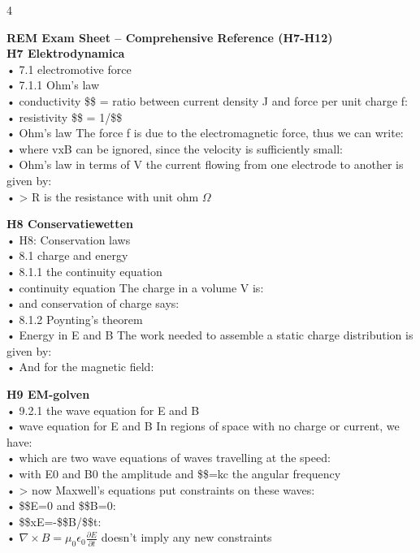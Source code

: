 \documentclass[8pt,a4paper]{article}
\begin{document}
\begin{multicols*}{4}

\textbf{\footnotesize REM Exam Sheet -- Comprehensive Reference (H7-H12)}\\[2pt]


\textbf{H7 Elektrodynamica}\\
• 7.1 electromotive force\\
• 7.1.1 Ohm's law\\
• conductivity \$\sigma\$  = ratio between current density J and force per unit charge f:\\
• resistivity \$\rho\$ = 1/\$\sigma\$\\
• Ohm's law The force f is due to the electromagnetic force, thus we can write:\\
• where vxB can be ignored, since the velocity is sufficiently small:\\
• Ohm's law in terms of V the current flowing from one electrode to another is given by:\\
• > R is the resistance with unit ohm $\Omega$\\
\columnbreak

\textbf{H8 Conservatiewetten}\\
• H8: Conservation laws\\
• 8.1 charge and energy\\
• 8.1.1 the continuity equation\\
• continuity equation The charge in a volume V is:\\
• and conservation of charge says:\\
• 8.1.2 Poynting's theorem\\
• Energy in E and B The work needed to assemble a static charge distribution is given by:\\
• And for the magnetic field:\\
\columnbreak

\textbf{H9 EM-golven}\\
• 9.2.1 the wave equation for E and B\\
• wave equation for E and B In regions of space with no charge or current, we have:\\
• which are two wave equations of waves travelling at the speed:\\
• with E0 and B0 the amplitude and \$\omega\$=kc the angular frequency\\
• > now Maxwell's equations put constraints on these waves:\\
• \$\nabla\$E=0 and \$\nabla\$B=0:\\
• \$\nabla\$xE=-\$\partial\$B/\$\partial\$t:\\
• $\nabla \times B = \mu_0 \epsilon_0 \frac{\partial E}{\partial t}$ doesn't imply any new constraints\\
\columnbreak


\end{multicols*}
\end{document}
